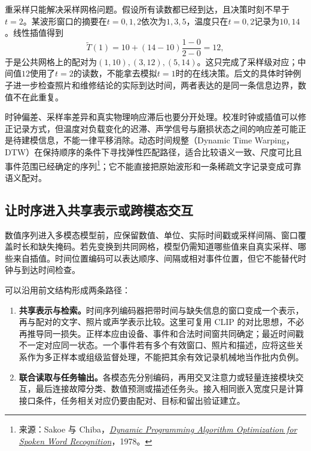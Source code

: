 重采样只能解决采样网格问题。假设所有读数都已经到达，且决策时刻不早于$t=2$。某波形窗口的摘要在$t=0,1,2$依次为$1,3,5$，温度只在$t=0,2$记录为$10,14$。线性插值得到
\begin{equation}
 \widetilde T(1)=10+(14-10)\frac{1-0}{2-0}=12,
\end{equation}
于是公共网格上的配对为$(1,10),(3,12),(5,14)$。这只完成了采样级对应；中间值$12$使用了$t=2$的读数，不能拿去模拟$t=1$时的在线决策。后文的具体时钟例子进一步检查照片和维修结论的实际到达时间，两者表达的是同一条信息边界，数值不在此重复。

时钟偏差、采样率差异和真实物理响应滞后也要分开处理。校准时钟或插值可以修正记录方式，但温度对负载变化的迟滞、声学信号与磨损状态之间的响应差可能正是待建模信息，不能一律平移消除。动态时间规整（Dynamic Time Warping，DTW）在保持顺序的条件下寻找弹性匹配路径，适合比较语义一致、尺度可比且事件范围已经确定的序列\footnote{来源：Sakoe 与 Chiba，\href{https://doi.org/10.1109/TASSP.1978.1163055}{\textit{Dynamic Programming Algorithm Optimization for Spoken Word Recognition}}，1978。}；它不能直接把原始波形和一条稀疏文字记录变成可靠语义配对。

\subsection{让时序进入共享表示或跨模态交互}
数值序列进入多模态模型前，应保留数值、单位、实际时间戳或采样间隔、窗口覆盖时长和缺失掩码。若先变换到共同网格，模型仍需知道哪些值来自真实采样、哪些来自插值。时间位置编码可以表达顺序、间隔或相对事件位置，但它不能替代时钟与到达时间检查。

可以沿用前文结构形成两条路径：
\begin{enumerate}[leftmargin=*]
\item \textbf{共享表示与检索。}时间序列编码器把带时间与缺失信息的窗口变成一个表示，再与配对的文字、照片或声学表示比较。这里可复用 CLIP 的对比思想，不必再推导同一损失。正样本应由设备、事件和合法时间窗共同确定；最近时间戳不一定对应同一状态。一个事件若有多个有效窗口、照片和描述，应将这些关系作为多正样本或组级监督处理，不能把其余有效记录机械地当作批内负例。
\item \textbf{联合读取与任务输出。}各模态先分别编码，再用交叉注意力或轻量连接模块交互，最后连接故障分类、数值预测或描述任务头。接入相同嵌入宽度只是计算接口条件，任务相关对应仍要由配对、目标和留出验证建立。
\end{enumerate}

